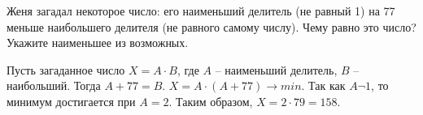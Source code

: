 
Женя загадал некоторое число: его наименьший делитель (не равный 1) на 77
 меньше наибольшего делителя (не равного самому числу). Чему равно это число? Укажите наименьшее из возможных.

\soultionSection

Пусть загаданное число $X = A \cdot B$, где $A$ -- наименьший делитель, $B$ -- наибольший. Тогда $A + 77 = B$. $X = A \cdot (A + 77) \to min$. Так как $A \neg 1$, то минимум достигается при $A = 2$. Таким образом, $X = 2 \cdot 79 = 158$.

